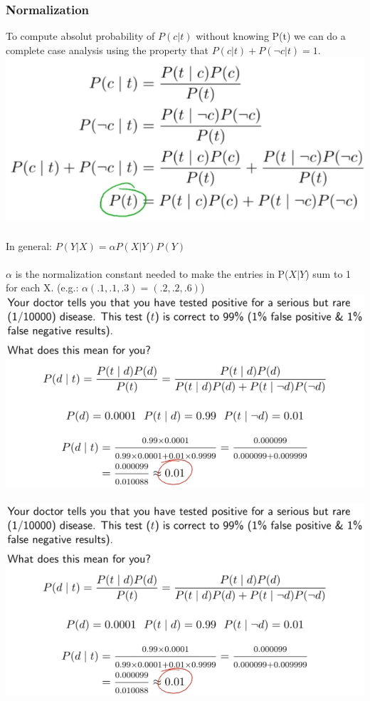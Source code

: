 \documentclass{article}
\begin{document}
\subsubsection{Normalization}
To compute absolut probability of $P(c|t)$ without knowing P(t) we can do a complete case analysis using the property that $P(c|t)+P(\neg c|t) = 1$.\\
\includegraphics[scale=0.4]{65.png}\\\\
In general: $P(Y|X)= \alpha P(X|Y)P(Y)$\\\\
$\alpha$ is the normalization constant needed to make the entries in P($X|Y$) sum to 1 for each X. (e.g.: $\alpha(.1,.1,.3) = (.2,.2,.6)$)\\
\includegraphics[scale=0.4]{66.png}\\\\
\includegraphics[scale=0.4]{67.png}\\\\
\end{document}

